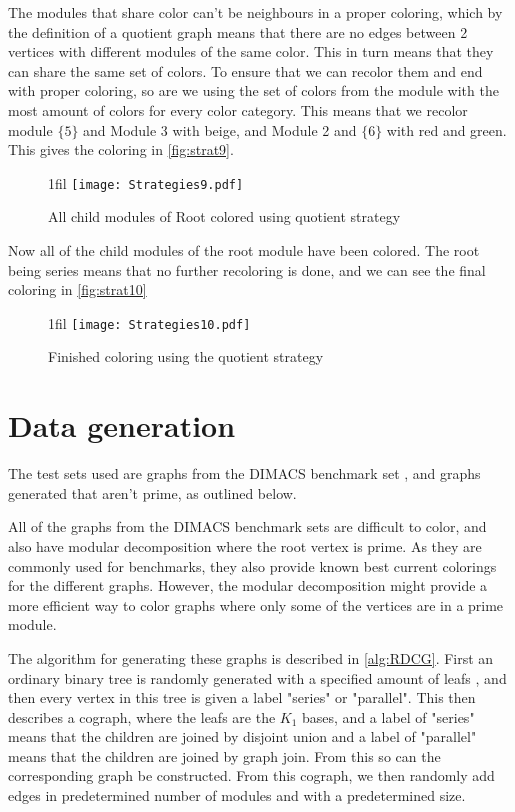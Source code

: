 \documentclass[a4paper]{article}
\makeatletter
\newcommand*{\centerfloat}{%
  \parindent \z@
  \leftskip \z@ \@plus 1fil \@minus \textwidth
  \rightskip\leftskip
  \parfillskip \z@skip}
\makeatother
\begin{document}
The modules that share color can't be neighbours in a proper coloring,
which by the definition of a quotient graph means that there are no edges
between 2 vertices with different modules of the same color. This in turn means
that they can share the same set of colors. To ensure that we can recolor them
and end with proper coloring, so are we using the set of colors from the module
with the most amount of colors for every color category. This means that we
recolor module $\{5\}$ and Module 3 with beige, and Module 2 and $\{6\}$ with
red and green. This gives the coloring in \autoref{fig:strat9}.

\begin{figure}[H]
    \centerfloat
    \texttt{[image: Strategies9.pdf]}
    \caption{All child modules of Root colored using quotient strategy}
    \label{fig:strat9}
\end{figure}

Now all of the child modules of the root module have been colored. The root
being series means that no further recoloring is done, and we can see the final
coloring in \autoref{fig:strat10}
\begin{figure}[H]
    \centerfloat
    \texttt{[image: Strategies10.pdf]}
    \caption{Finished coloring using the quotient strategy}
    \label{fig:strat10}
\end{figure}

\section{Data generation}
\label{sec:Data}

The test sets used are graphs from the DIMACS benchmark set \cite{DIMACS}, 
and graphs generated that aren't prime, as outlined below.

All of the graphs from the DIMACS benchmark sets are difficult to color,
and also have modular decomposition where the root vertex is prime. As they are
commonly used for benchmarks, they also provide known best current colorings for the
different graphs. However, the modular decomposition might provide a more
efficient way to color graphs where only some of the vertices are in a prime module. 

The algorithm for generating these graphs is described in \autoref{alg:RDCG}.
First an ordinary binary tree is randomly generated with a specified amount of
leafs , and then every vertex in this tree is given a label "series" or
"parallel".  This then describes a cograph, where the leafs are the $K_1$ bases,
and a label of "series" means that the children are joined by disjoint union and
a label of "parallel" means that the children are joined by graph join.  From
this so can the corresponding graph be constructed. From this cograph, we then
randomly add edges in predetermined number of modules and with a predetermined
size. 
\end{document}
